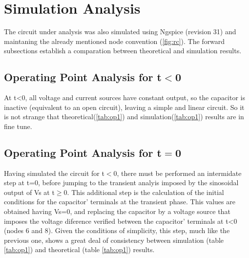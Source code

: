 \section{Simulation Analysis}
\label{sec:simulation}

The circuit under analysis was also simulated using Ngspice (revision 31) and maintaning the already mentioned node convention (\ref{fig:rc}). The forward subsections establish a comparation between theoretical and simulation results.

\subsection{Operating Point Analysis for t$<$0}

At t<0, all voltage and current sources have constant output, so the capacitor is inactive (equivalent to an open circuit), leaving a simple and linear circuit. So it is not strange that theoretical(\ref{tab:op1}) and simulation(\ref{tab:op1}) results are in fine tune.


\begin{table}[h]
  \centering
 \caption{Simulation results. A variable preceded by @ is of type {\em current}
   and expressed in Ampere; other variables are of type {\it voltage} and expressed in
   Volt.}
  \label{tab:op1}
\end{table}


\subsection{Operating Point Analysis for t$=$0}

Having simulated the circuit for t$<$0, there must be performed an intermidate step at t=0, before jumping to the transient analyis imposed by the sinosoidal output of Vs at t$\geq$0. This additional step is the calculation of the initial conditions for the capacitor' terminals at the transient phase. This values are obtained having Vs=0, and replacing the capacitor by a voltage source that imposes the voltage diference verified between the capacitor' terminals at t<0 (nodes 6 and 8). Given the conditions of simplicity, this step, much like the previous one, shows a great deal of consistency between simulation (table \ref{tab:op1}) and theoretical (table \ref{tab:op1}) results. 

